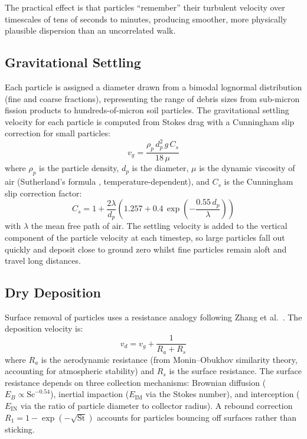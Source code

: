 \documentclass[11pt,a4paper]{article}
\begin{document}
The practical effect is that particles ``remember'' their turbulent velocity
over timescales of tens of seconds to minutes, producing smoother, more
physically plausible dispersion than an uncorrelated walk.

\subsection{Gravitational Settling}

Each particle is assigned a diameter drawn from a bimodal lognormal
distribution (fine and coarse fractions), representing the range of debris
sizes from sub-micron fission products to hundreds-of-micron soil
particles. The gravitational settling velocity for each particle is computed
from Stokes drag with a Cunningham slip correction \cite{cunningham1910} for small particles:
\begin{equation}
    v_g = \frac{\rho_p\, d_p^2\, g\, C_s}{18\,\mu}
\end{equation}
where $\rho_p$ is the particle density, $d_p$ is the diameter, $\mu$ is the
dynamic viscosity of air (Sutherland's formula \cite{sutherland1893}, temperature-dependent), and
$C_s$ is the Cunningham slip correction factor:
\begin{equation}
    C_s = 1 + \frac{2\lambda}{d_p}\left(1.257 + 0.4\,\exp\!\left(-\frac{0.55\,d_p}{\lambda}\right)\right)
\end{equation}
with $\lambda$ the mean free path of air. The settling velocity is added to
the vertical component of the particle velocity at each timestep, so large
particles fall out quickly and deposit close to ground zero whilst fine
particles remain aloft and travel long distances.

\subsection{Dry Deposition}

Surface removal of particles uses a resistance analogy following Zhang et
al.~\cite{zhang2001}. The deposition velocity is:
\begin{equation}
    v_d = v_g + \frac{1}{R_a + R_s}
\end{equation}
where $R_a$ is the aerodynamic resistance (from Monin--Obukhov similarity
theory, accounting for atmospheric stability) and $R_s$ is the surface
resistance. The surface resistance depends on three collection mechanisms:
Brownian diffusion ($E_B \propto \mathrm{Sc}^{-0.54}$), inertial impaction
($E_{\mathrm{IM}}$ via the Stokes number), and interception ($E_{\mathrm{IN}}$
via the ratio of particle diameter to collector radius). A rebound correction
$R_1 = 1 - \exp(-\sqrt{\mathrm{St}})$ accounts for particles bouncing off
surfaces rather than sticking.
\end{document}
